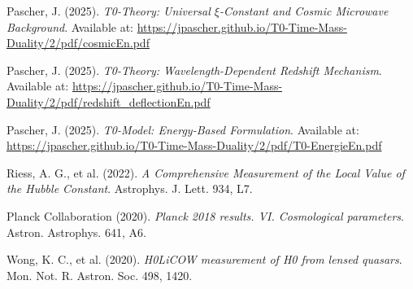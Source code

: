 \documentclass[12pt,a4paper]{article}
\begin{document}
	\begin{thebibliography}{99}
		
		Pascher, J. (2025). \textit{T0-Theory: Universal $\xi$-Constant and Cosmic Microwave Background}. Available at: \url{https://jpascher.github.io/T0-Time-Mass-Duality/2/pdf/cosmicEn.pdf}
		
		Pascher, J. (2025). \textit{T0-Theory: Wavelength-Dependent Redshift Mechanism}. Available at: \url{https://jpascher.github.io/T0-Time-Mass-Duality/2/pdf/redshift_deflectionEn.pdf}
		
		Pascher, J. (2025). \textit{T0-Model: Energy-Based Formulation}. Available at: \url{https://jpascher.github.io/T0-Time-Mass-Duality/2/pdf/T0-EnergieEn.pdf}
		
		Riess, A. G., et al. (2022). \textit{A Comprehensive Measurement of the Local Value of the Hubble Constant}. Astrophys. J. Lett. 934, L7.
		
		Planck Collaboration (2020). \textit{Planck 2018 results. VI. Cosmological parameters}. Astron. Astrophys. 641, A6.
		
		Wong, K. C., et al. (2020). \textit{H0LiCOW measurement of H0 from lensed quasars}. Mon. Not. R. Astron. Soc. 498, 1420.
		
	\end{thebibliography}
	
\end{document}
